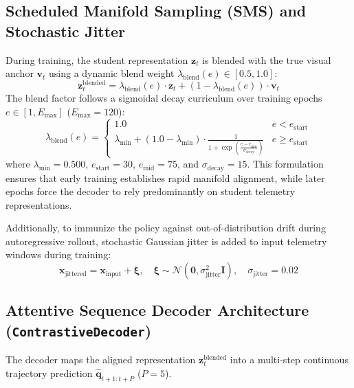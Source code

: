 \documentclass[11pt,a4paper]{article}
\begin{document}
\subsection{Scheduled Manifold Sampling (SMS) and Stochastic Jitter}
During training, the student representation $\mathbf{z}_t$ is blended with the true visual anchor $\mathbf{v}_t$ using a dynamic blend weight $\lambda_{\text{blend}}(e) \in [0.5, 1.0]$:
\begin{equation}
    \mathbf{z}_t^{\text{blended}} = \lambda_{\text{blend}}(e) \cdot \mathbf{z}_t + (1 - \lambda_{\text{blend}}(e)) \cdot \mathbf{v}_t
\end{equation}
The blend factor follows a sigmoidal decay curriculum over training epochs $e \in [1, E_{\text{max}}]$ ($E_{\text{max}} = 120$):
\begin{equation}
    \lambda_{\text{blend}}(e) = \begin{cases} 
    1.0 & e < e_{\text{start}} \\ 
    \lambda_{\text{min}} + (1.0 - \lambda_{\text{min}}) \cdot \frac{1}{1 + \exp\left(\frac{e - e_{\text{mid}}}{\sigma_{\text{decay}}}\right)} & e \ge e_{\text{start}} 
    \end{cases}
\end{equation}
where $\lambda_{\text{min}} = 0.500$, $e_{\text{start}} = 30$, $e_{\text{mid}} = 75$, and $\sigma_{\text{decay}} = 15$. This formulation ensures that early training establishes rapid manifold alignment, while later epochs force the decoder to rely predominantly on student telemetry representations.

Additionally, to immunize the policy against out-of-distribution drift during autoregressive rollout, stochastic Gaussian jitter is added to input telemetry windows during training:
\begin{equation}
    \mathbf{x}_{\text{jittered}} = \mathbf{x}_{\text{input}} + \boldsymbol{\xi}, \quad \boldsymbol{\xi} \sim \mathcal{N}(\mathbf{0}, \sigma_{\text{jitter}}^2 \mathbf{I}), \quad \sigma_{\text{jitter}} = 0.02
\end{equation}

\subsection{Attentive Sequence Decoder Architecture (\texttt{ContrastiveDecoder})}
The decoder maps the aligned representation $\mathbf{z}_t^{\text{blended}}$ into a multi-step continuous trajectory prediction $\hat{\mathbf{q}}_{t+1:t+P}$ ($P = 5$).
\end{document}

